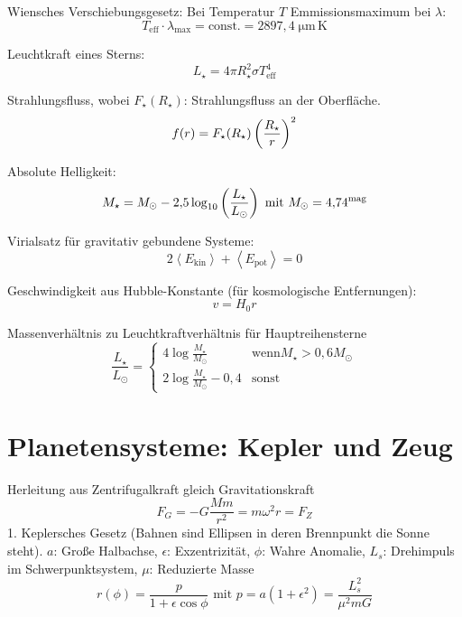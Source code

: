 \documentclass[a4paper,german,12pt,smallheadings,twocolumn]{scrartcl}
\begin{document}
Wiensches Verschiebungsgesetz: Bei Temperatur $T$ Emmissionsmaximum bei $\lambda$:
\begin{equation}
  T_\text{eff} \cdot \lambda_\text{max} = \text{const.} = 2897{,}4 \; \mathrm{\mu m\, K}
\end{equation}

Leuchtkraft eines Sterns:
\begin{equation}
  L_\star = 4 \pi R_\star^2 \sigma T^4_\text{eff}
\end{equation}

Strahlungsfluss, wobei $F_\star(R_\star)$: Strahlungsfluss an der Oberfläche.
\begin{equation}
  f(r) = F_\star(R_\star) \del{\frac{R_\star}{r}}^2
\end{equation}

Absolute Helligkeit:
\begin{equation}
  M_\star = M_\odot - 2{,}5 \log_{10} \del{\frac{L_\star}{L_\odot}} \text{ mit } M_\odot = 4{,}74^\text{mag}
\end{equation}

Virialsatz für gravitativ gebundene Systeme:
\begin{equation}
  2 \left<E_\text{kin}\right> + \left<E_\text{pot}\right> = 0
\end{equation}

Geschwindigkeit aus Hubble-Konstante (für kosmologische Entfernungen):
\begin{equation}
  v = H_0 r
\end{equation}

Massenverhältnis zu Leuchtkraftverhältnis für Hauptreihensterne
\begin{equation}
  \frac{L_\star}{L_\odot} = \begin{cases}
    4 \log \frac{M_\star}{M_\odot} & \text{wenn} M_\star > 0{,}6 M_\odot \\
    2 \log \frac{M_\star}{M_\odot} - 0{,}4 & \text{sonst}
  \end{cases}
\end{equation}

\section*{Planetensysteme: Kepler und Zeug}
Herleitung aus Zentrifugalkraft gleich Gravitationskraft
\begin{equation}
  F_G = - G \frac{Mm}{r^2} = m \omega^2 r = F_Z
\end{equation}
1. Keplersches Gesetz (Bahnen sind Ellipsen in deren Brennpunkt die Sonne
steht). $a$: Große Halbachse, $\epsilon$: Exzentrizität, $\phi$: Wahre
Anomalie, $L_s$: Drehimpuls im Schwerpunktsystem, $\mu$: Reduzierte Masse
\begin{equation}
  r(\phi) = \frac{p}{1 + \epsilon \cos \phi} \text{ mit } p = a(1+\epsilon^2) = \frac{L_s^2}{\mu^2 mG}
\end{equation}
\end{document}
